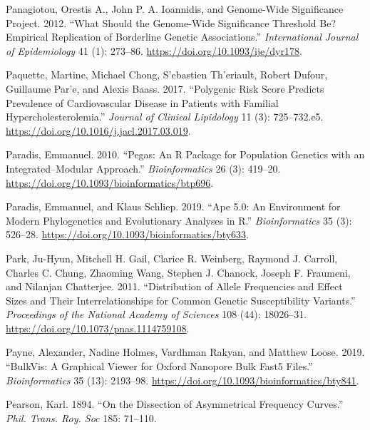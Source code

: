 \documentclass[
]{book}
\newlength{\cslhangindent}
\newlength{\cslentryspacingunit} %
\newenvironment{CSLReferences}[2] %
 {%
  \setlength{\parindent}{0pt}
  \ifodd #1
  \let\oldpar\par
  \def\par{\hangindent=\cslhangindent\oldpar}
  \fi
  \setlength{\parskip}{#2\cslentryspacingunit}
 }%
 {}
\begin{document}
\begin{CSLReferences}{1}{0}
\leavevmode{}%
Panagiotou, Orestis A., John P. A. Ioannidis, and Genome-Wide Significance Project. 2012. {``What Should the Genome-Wide Significance Threshold Be? {Empirical} Replication of Borderline Genetic Associations.''} \emph{International Journal of Epidemiology} 41 (1): 273--86. \url{https://doi.org/10.1093/ije/dyr178}.

\leavevmode{}%
Paquette, Martine, Michael Chong, S'ebastien Th'eriault, Robert Dufour, Guillaume Par'e, and Alexis Baass. 2017. {``Polygenic Risk Score Predicts Prevalence of Cardiovascular Disease in Patients with Familial Hypercholesterolemia.''} \emph{Journal of Clinical Lipidology} 11 (3): 725--732.e5. \url{https://doi.org/10.1016/j.jacl.2017.03.019}.

\leavevmode{}%
Paradis, Emmanuel. 2010. {``Pegas: An {R} Package for Population Genetics with an Integrated--Modular Approach.''} \emph{Bioinformatics} 26 (3): 419--20. \url{https://doi.org/10.1093/bioinformatics/btp696}.

\leavevmode{}%
Paradis, Emmanuel, and Klaus Schliep. 2019. {``Ape 5.0: An Environment for Modern Phylogenetics and Evolutionary Analyses in {R}.''} \emph{Bioinformatics} 35 (3): 526--28. \url{https://doi.org/10.1093/bioinformatics/bty633}.

\leavevmode{}%
Park, Ju-Hyun, Mitchell H. Gail, Clarice R. Weinberg, Raymond J. Carroll, Charles C. Chung, Zhaoming Wang, Stephen J. Chanock, Joseph F. Fraumeni, and Nilanjan Chatterjee. 2011. {``Distribution of Allele Frequencies and Effect Sizes and Their Interrelationships for Common Genetic Susceptibility Variants.''} \emph{Proceedings of the National Academy of Sciences} 108 (44): 18026--31. \url{https://doi.org/10.1073/pnas.1114759108}.

\leavevmode{}%
Payne, Alexander, Nadine Holmes, Vardhman Rakyan, and Matthew Loose. 2019. {``{BulkVis}: A Graphical Viewer for {Oxford} Nanopore Bulk {Fast5} Files.''} \emph{Bioinformatics} 35 (13): 2193--98. \url{https://doi.org/10.1093/bioinformatics/bty841}.

\leavevmode{}%
Pearson, Karl. 1894. {``On the Dissection of Asymmetrical Frequency Curves.''} \emph{Phil. Trans. Roy. Soc} 185: 71--110.


\end{CSLReferences}
\end{document}
